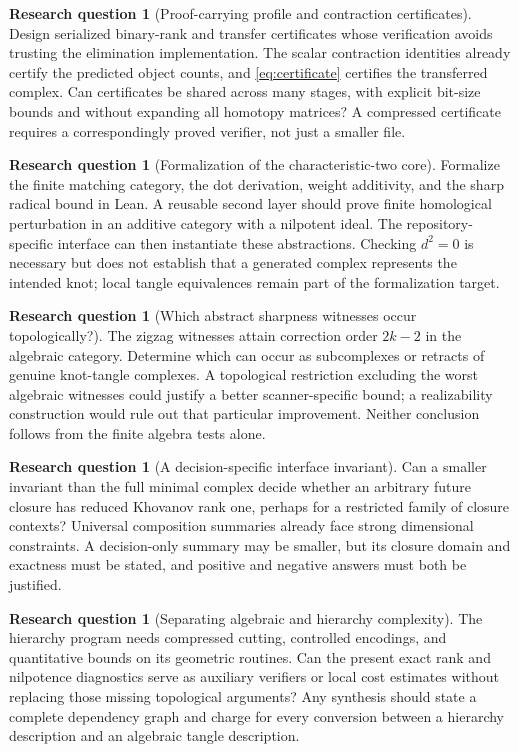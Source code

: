 \documentclass[11pt,letterpaper]{article}
\theoremstyle{definition}
\newtheorem{question}[theorem]{Research question}
\theoremstyle{remark}
\begin{document}
\begin{question}[Proof-carrying profile and contraction certificates]
Design serialized binary-rank and transfer certificates whose verification
avoids trusting the elimination implementation. The scalar contraction
identities already certify the predicted object counts, and
\cref{eq:certificate} certifies the transferred complex. Can certificates be
shared across many stages, with explicit bit-size bounds and without expanding
all homotopy matrices? A compressed certificate requires a correspondingly
proved verifier, not just a smaller file.
\end{question}

\begin{question}[Formalization of the characteristic-two core]
Formalize the finite matching category, the dot derivation, weight additivity,
and the sharp radical bound in Lean. A reusable second layer should prove
finite homological perturbation in an additive category with a nilpotent ideal.
The repository-specific interface can then instantiate these abstractions.
Checking $d^2=0$ is necessary but does not establish that a generated complex
represents the intended knot; local tangle equivalences remain part of the
formalization target.
\end{question}

\begin{question}[Which abstract sharpness witnesses occur topologically?]
The zigzag witnesses attain correction order $2k-2$ in the algebraic category.
Determine which can occur as subcomplexes or retracts of genuine knot-tangle
complexes. A topological restriction excluding the worst algebraic witnesses
could justify a better scanner-specific bound; a realizability construction
would rule out that particular improvement. Neither conclusion follows from
the finite algebra tests alone.
\end{question}

\begin{question}[A decision-specific interface invariant]
Can a smaller invariant than the full minimal complex decide whether an
arbitrary future closure has reduced Khovanov rank one, perhaps for a restricted
family of closure contexts? Universal composition summaries already face
strong dimensional constraints. A decision-only summary may be smaller, but
its closure domain and exactness must be stated, and positive and negative
answers must both be justified.
\end{question}

\begin{question}[Separating algebraic and hierarchy complexity]
The hierarchy program needs compressed cutting, controlled encodings, and
quantitative bounds on its geometric routines. Can the present exact rank and
nilpotence diagnostics serve as auxiliary verifiers or local cost estimates
without replacing those missing topological arguments? Any synthesis should
state a complete dependency graph and charge for every conversion between a
hierarchy description and an algebraic tangle description.
\end{question}
\end{document}
